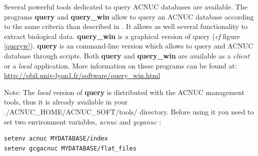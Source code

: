 \documentclass{article}
\begin{document}
Several powerful tools dedicated to query ACNUC databases are available. 
The programs \textbf{query} and \textbf{query\_win} allow to query an ACNUC database according to the same
criteria than described  in \seqinr{}. It allows as well several functionality to extract biological data.
\textbf{query\_win} is a graphical version of query (\textit{cf} figure \ref{queryw}).
\textbf{query} is an command-line version which allows to query and ACNUC database through scripts.
Both \textbf{query} and  \textbf{query\_win} are available as a
\textit{client} or a \textit{local} application. More information on these programs can be found at:
\url{http://pbil.univ-lyon1.fr/software/query_win.html}

\begin{figure}
\end{figure}


Note:
The \textit{local} version of \textbf{query} is distributed with the ACNUC management  tools,
 thus it is already available in your ./ACNUC\_HOME/ACNUC\_SOFT/tools/ directory.
Before using it you need to set two environment  variables, \textit{acnuc} and \textit{gcganuc} :
\begin{verbatim}
setenv acnuc MYDATABASE/index
setenv gcgacnuc MYDATABASE/flat_files 
\end{verbatim}
\end{document}
